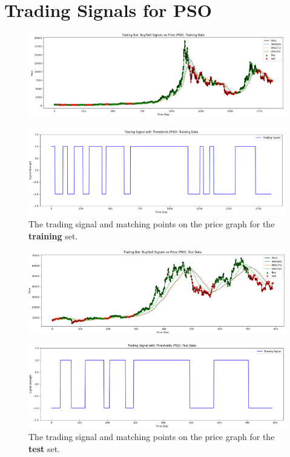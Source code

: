 \documentclass[a4paper, 12pt]{extarticle}
\begin{document}
\newpage
\printbibliography

\newpage
\appendix
\section{Trading Signals for PSO}
\begin{figure}[h!]
    \centering
    \includegraphics[width=\textwidth]{./assets/pso_train.png}
\end{figure}
\begin{figure}[h!]
    \centering
    \includegraphics[width=\textwidth]{./assets/pso_train_signal.png}
    \caption{The trading signal and matching points on the price graph for the \textbf{training} set.}
\end{figure}
\newpage
\begin{figure}[h!]
    \centering
    \includegraphics[width=\textwidth]{./assets/pso_test.png}
\end{figure}
\begin{figure}[h!]
    \centering
    \includegraphics[width=\textwidth]{./assets/pso_test_signal.png}
    \caption{The trading signal and matching points on the price graph for the \textbf{test} set.}
\end{figure}
\end{document}
